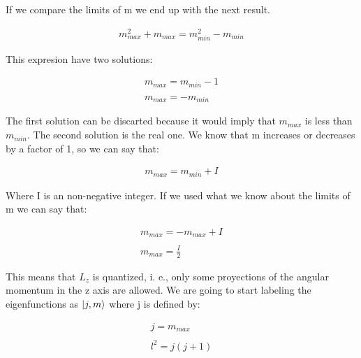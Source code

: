 If we compare the limits of m we end up with the next result.

\begin{equation}
  \begin{array}{c}
    m^2_{max} + m_{max} = m^2_{min} - m_{min}
  \end{array}
\end{equation}

This expresion have two solutions:

\begin{equation}
  \begin{array}{c}
    m_{max} = m_{min} - 1
    \\

    \\
    m_{max} = - m_{min}
  \end{array}
\end{equation}

The first solution can be discarted because it would imply that $m_{max}$ is less than $m_{min}$. The second solution is the real one. We know that m increases or decreases by a factor of 1, so we can say that:

\begin{equation}
  \begin{array}{c}
    m_{max} = m_{min} + I
  \end{array}
\end{equation}

Where I is an non-negative integer. If we used what we know about the limits of m we can say that:

\begin{equation}
  \begin{array}{c}
    m_{max} = - m_{max} + I
    \\

    \\
    m_{max} = \frac{I}{2}
  \end{array}
\end{equation}

This means that $L_z$ is quantized, i. e., only some proyections of the angular momentum in the z axis are allowed. We are going to start labeling the eigenfunctions as $\lvert j,m\rangle$ where j is defined by:

\begin{equation}
  \begin{array}{c}
    j = m_{max}
    \\

    \\
    l^2 = j(j+1)
  \end{array}
\end{equation}

